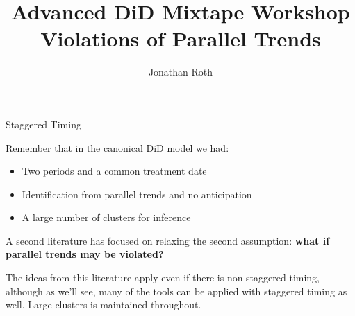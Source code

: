 \documentclass[usenames, dvipsnames, aspectratio = 169, 13pt]{beamer}
\author{Jonathan Roth}
\title[Advanced DiD Mixtape Workshop]{Advanced DiD Mixtape Workshop \\ Violations of Parallel Trends}
\newenvironment{wideitemize}{\itemize\addtolength{\itemsep}{10pt}}{\enditemize}
\begin{document}
\maketitle


\begin{frame}{Staggered Timing}
\begin{wideitemize}
    \item
    Remember that in the canonical DiD model we had:
    
    \begin{itemize}
        \item 
        Two periods and a common treatment date
        
        \item
        Identification from parallel trends and no anticipation
        
        \item
        A large number of clusters for inference
    \end{itemize}
    
    \item
    A second literature has focused on relaxing the second assumption: \textbf{what if parallel trends may be violated?}
    
    \item
    The ideas from this literature apply even if there is non-staggered timing, although as we'll see, many of the tools can be applied with staggered timing as well. Large clusters is maintained throughout. 
    
\end{wideitemize}

\end{frame}
\end{document}
